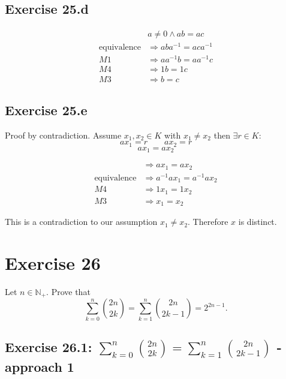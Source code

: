 \documentclass[a4paper]{article}
\theoremstyle{definition}
\begin{document}
\subsection{Exercise 25.d}

\begin{align*}
                     & a \neq 0 \land ab = ac \\
  \text{equivalence} &\Rightarrow aba^{-1} = aca^{-1} \\
                  M1 &\Rightarrow aa^{-1}b = aa^{-1}c \\
                  M4 &\Rightarrow 1b = 1c \\
                  M3 &\Rightarrow b = c
\end{align*}

\subsection{Exercise 25.e}

Proof by contradiction.
Assume $x_1, x_2 \in K$ with $x_1 \neq x_2$ then $\exists r \in K$:
\[ ax_1 = r \qquad ax_2 = r \]
\[ ax_1 = ax_2 \]

\begin{align*}
                     &\Rightarrow ax_1 = ax_2 \\
  \text{equivalence} &\Rightarrow a^{-1} ax_1 = a^{-1} ax_2 \\
                  M4 &\Rightarrow 1x_1 = 1x_2 \\
                  M3 &\Rightarrow x_1 = x_2
\end{align*}

This is a contradiction to our assumption $x_1 \neq x_2$.
Therefore $x$ is distinct.

\section{Exercise 26}
\begin{ex}
  Let $n \in \mathbb N_+$. Prove that
  \[ \sum_{k=0}^n \binom{2n}{2k} = \sum_{k=1}^n \binom{2n}{2k-1} = 2^{2n-1}. \]
\end{ex}

\subsection{Exercise 26.1: $\sum_{k=0}^n \binom{2n}{2k} = \sum_{k=1}^n \binom{2n}{2k-1}$ - approach 1}
\end{document}
